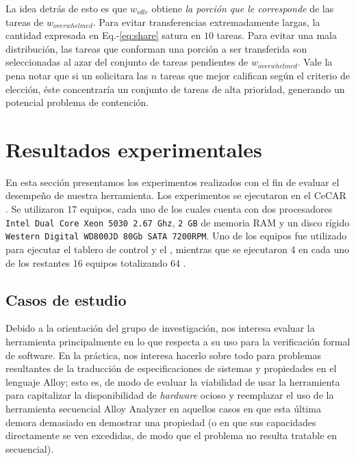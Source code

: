 La idea detrás de esto es que $w_{idle}$
obtiene \emph{la porción que le corresponde} de las tareas de
$w_{overwhelmed}$. Para evitar transferencias extremadamente largas, la
cantidad expresada en Eq.-\ref{eq:share} satura en $10$ tareas. Para evitar
una mala distribución, las tareas que conforman una porción a ser transferida
son seleccionadas al azar del conjunto de tareas pendientes de
$w_{overwhelmed}$. Vale la pena notar que si un \w solicitara las $n$ tareas que mejor califican según el criterio de elección, éste concentraría un conjunto de tareas de alta prioridad, generando un potencial problema de contención.

\section{Resultados experimentales}

En esta sección presentamos los experimentos realizados con el fin de evaluar
el desempeño de nuestra herramienta.  Los experimentos se ejecutaron en el
\cluster CeCAR \cite{cecar??}. Se utilizaron 17 equipos,
cada uno de los cuales cuenta con dos procesadores \texttt{Intel Dual Core Xeon
5030 2.67 Ghz}, \texttt{2 GB} de memoria RAM y un disco rígido \texttt{Western
Digital WD800JD 80Gb SATA 7200RPM}. Uno de los equipos fue utilizado para
ejecutar el tablero de control y el \master, mientras que se ejecutaron 4 \ws
en cada uno de los restantes 16 equipos totalizando 64 \ws.


\subsection{Casos de estudio}

Debido a la orientación del grupo de investigación, nos interesa evaluar la herramienta principalmente en lo que respecta a su uso para la verificación formal de software. En la práctica, nos interesa hacerlo sobre todo para problemas resultantes de la traducción de especificaciones de sistemas y propiedades en el lenguaje Alloy; esto es, de modo de evaluar la viabilidad de usar la herramienta para capitalizar la disponibilidad de \emph{hardware} ocioso y reemplazar el uso de la herramienta secuencial Alloy Analyzer en aquellos casos en que esta última demora demasiado en demostrar una propiedad (o en que sus capacidades directamente se ven excedidas, de modo que el problema no resulta tratable en secuencial).

